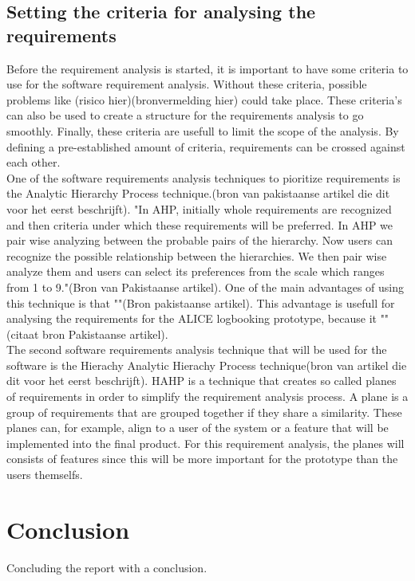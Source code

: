 \documentclass[paper=a4, fontsize=11pt,twoside]{scrartcl}	%
\begin{document}
\subsection{Setting the criteria for analysing the requirements}
Before the requirement analysis is started, it is important to have some criteria to use for the software requirement analysis. Without these criteria, possible problems like (risico hier)(bronvermelding hier) could take place. These criteria's can also be used to create a structure for the requirements analysis to go smoothly. Finally, these criteria are usefull to limit the scope of the analysis. By defining a pre-established amount of criteria, requirements can be crossed against each other.
\\
One of the software requirements analysis techniques to pioritize requirements is the Analytic Hierarchy Process technique.(bron van pakistaanse artikel die dit voor het eerst beschrijft). "In AHP,   initially whole requirements are recognized and then criteria under which these requirements will be preferred. In AHP we pair wise analyzing  between  the  probable  pairs  of  the  hierarchy. 
Now users can recognize the possible relationship between 
the hierarchies. We then pair wise analyze them and users can select its preferences from the scale which ranges from 
1 to 9."(Bron van Pakistaanse artikel). One of the main advantages of using this technique is that ""(Bron pakistaanse artikel). This advantage is usefull for analysing the requirements for the ALICE logbooking prototype,  because it ""(citaat bron Pakistaanse artikel). 
\\
The second software requirements analysis technique that will be used for the software is the Hierachy Analytic Hierachy Process technique(bron van artikel die dit voor het eerst beschrijft). HAHP is a technique that creates so called planes of requirements in order to simplify the requirement analysis process. A plane is a group of requirements that are grouped together if they share a similarity. These planes can, for example, align to a user of the system or a feature that will be implemented into the final product. For this requirement analysis, the planes will consists of features since this will be more important for the prototype than the users themselfs.



\newpage
\section{Conclusion}
Concluding the report with a conclusion.
\newpage
\end{document}
